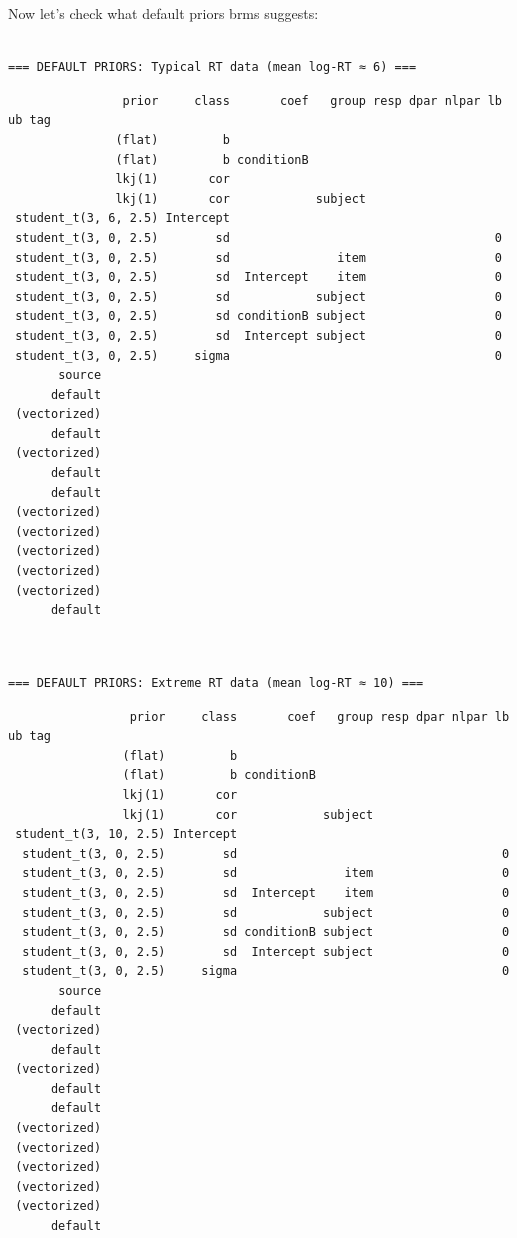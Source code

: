 \documentclass[
  11pt,
]{article}
\begin{document}
Now let's check what default priors brms suggests:

\begin{verbatim}

=== DEFAULT PRIORS: Typical RT data (mean log-RT ≈ 6) ===
\end{verbatim}

\begin{verbatim}
                prior     class       coef   group resp dpar nlpar lb ub tag
               (flat)         b                                             
               (flat)         b conditionB                                  
               lkj(1)       cor                                             
               lkj(1)       cor            subject                          
 student_t(3, 6, 2.5) Intercept                                             
 student_t(3, 0, 2.5)        sd                                     0       
 student_t(3, 0, 2.5)        sd               item                  0       
 student_t(3, 0, 2.5)        sd  Intercept    item                  0       
 student_t(3, 0, 2.5)        sd            subject                  0       
 student_t(3, 0, 2.5)        sd conditionB subject                  0       
 student_t(3, 0, 2.5)        sd  Intercept subject                  0       
 student_t(3, 0, 2.5)     sigma                                     0       
       source
      default
 (vectorized)
      default
 (vectorized)
      default
      default
 (vectorized)
 (vectorized)
 (vectorized)
 (vectorized)
 (vectorized)
      default
\end{verbatim}

\begin{verbatim}


=== DEFAULT PRIORS: Extreme RT data (mean log-RT ≈ 10) ===
\end{verbatim}

\begin{verbatim}
                 prior     class       coef   group resp dpar nlpar lb ub tag
                (flat)         b                                             
                (flat)         b conditionB                                  
                lkj(1)       cor                                             
                lkj(1)       cor            subject                          
 student_t(3, 10, 2.5) Intercept                                             
  student_t(3, 0, 2.5)        sd                                     0       
  student_t(3, 0, 2.5)        sd               item                  0       
  student_t(3, 0, 2.5)        sd  Intercept    item                  0       
  student_t(3, 0, 2.5)        sd            subject                  0       
  student_t(3, 0, 2.5)        sd conditionB subject                  0       
  student_t(3, 0, 2.5)        sd  Intercept subject                  0       
  student_t(3, 0, 2.5)     sigma                                     0       
       source
      default
 (vectorized)
      default
 (vectorized)
      default
      default
 (vectorized)
 (vectorized)
 (vectorized)
 (vectorized)
 (vectorized)
      default
\end{verbatim}
\end{document}
